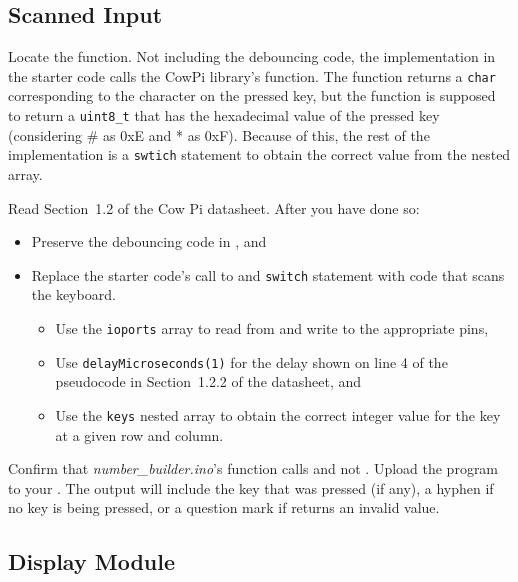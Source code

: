 \subsection{Scanned Input}

Locate the  function.
Not including the debouncing code, the implementation in the starter code calls the CowPi library's  function.
The  function returns a \lstinline{char} corresponding to the character on the pressed key,
but the  function is supposed to return a \lstinline{uint8_t} that has the hexadecimal value of the pressed key (considering \# as 0xE and * as 0xF).
Because of this, the rest of the implementation is a \lstinline{swtich} statement to obtain the correct value from the  nested array.

Read Section~1.2 of the Cow Pi datasheet.
After you have done so:

\begin{itemize}
    \item Preserve the debouncing code in , and
    \item Replace the starter code's call to  and \lstinline{switch} statement with code that scans the keyboard.
        \begin{itemize}
            \item Use the \lstinline{ioports} array to read from and write to the appropriate pins,
            \item Use \lstinline{delayMicroseconds(1)} for the delay shown on line 4 of the pseudocode in Section~1.2.2 of the datasheet, and
            \item Use the \lstinline{keys} nested array to obtain the correct integer value for the key at a given row and column.
        \end{itemize}
\end{itemize}

Confirm that \textit{number\_builder.ino}'s  function calls  and not .
Upload the program to your \developmentboard.
The output will include the key that was pressed (if any), a hyphen if no key is being pressed, or a question mark if  returns an invalid value.


\subsection{Display Module}


